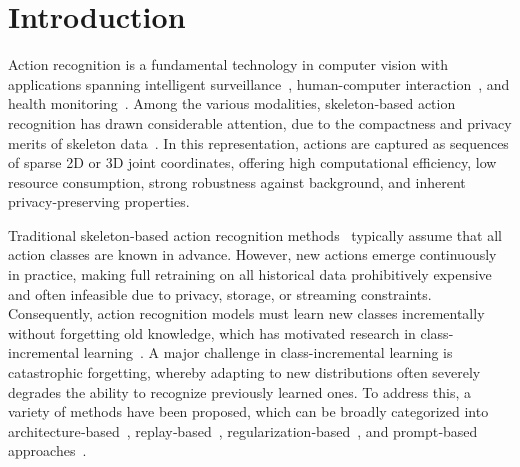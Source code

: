 \documentclass[journal]{IEEEtran}
\begin{document}
\section{Introduction}

\IEEEPARstart
Action recognition is a fundamental technology in computer vision with applications spanning intelligent surveillance~\cite{Guo2023}, human-computer interaction~\cite{weng2020early}, and health monitoring~\cite{liu2021}. 
Among the various modalities, skeleton‑based action recognition has drawn considerable attention, due to the compactness and privacy merits of skeleton data~\cite{sun2022,hinojosa2022}. 
In this representation, actions are captured as sequences of sparse 2D or 3D joint coordinates, offering high computational efficiency, low resource consumption, strong robustness against background, and inherent privacy-preserving properties.

Traditional skeleton‑based action recognition methods~\cite{Yan2018STGCN,Liu2024,liu2024signal,liu2025adaptive} typically assume that all action classes are known in advance.
However, new actions emerge continuously in practice, making full retraining on all historical data prohibitively expensive and often infeasible due to privacy, storage, or streaming constraints. 
Consequently, action recognition models must learn new classes incrementally without forgetting old knowledge, which has motivated research in class-incremental learning~\cite{wang2024survey}.
A major challenge in class-incremental learning is catastrophic forgetting, whereby adapting to new distributions often severely degrades the ability to recognize previously learned ones.
To address this, a variety of methods have been proposed, which can be broadly categorized into architecture‑based~\cite{Serra2018,wang2022coscl,wang2023neuro}, replay‑based~\cite{rebuffi2017,buzzega2020,liu2025fewshot}, regularization‑based~\cite{kirkpatrick2017,li2018,Xu2026physical,Xu2026hyperbolic}, and prompt‑based approaches~\cite{Villa2023,razdaibiedina2023,Lu2025}.
\end{document}

